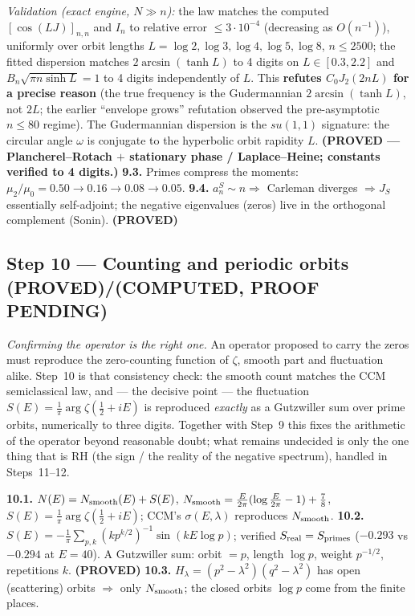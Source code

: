 \documentclass[11pt]{amsart}
\theoremstyle{definition}
\theoremstyle{remark}
\newcommand{\PROVED}{\textbf{(PROVED)}}
\newcommand{\COMP}{\textbf{(COMPUTED, PROOF PENDING)}}
\begin{document}
\noindent\emph{Validation (exact engine, $N\gg n$):} the law matches the computed
$[\cos(LJ)]_{n,n}$ and $I_n$ to relative error $\le3\cdot10^{-4}$ (decreasing as $O(n^{-1})$),
uniformly over orbit lengths $L=\log2,\log3,\log4,\log5,\log8$, $n\le2500$; the fitted dispersion
matches $2\arcsin(\tanh L)$ to 4 digits on $L\in[0.3,2.2]$ and $B_n\sqrt{\pi n\sinh L}=1$ to 4
digits independently of $L$. This \textbf{refutes $C_0J_2(2nL)$ for a precise reason} (the true
frequency is the Gudermannian $2\arcsin(\tanh L)$, not $2L$; the earlier ``envelope grows''
refutation observed the pre-asymptotic $n\le80$ regime). The Gudermannian dispersion is the
$su(1,1)$ signature: the circular angle $\omega$ is conjugate to the hyperbolic orbit rapidity $L$.
\textbf{(PROVED --- Plancherel--Rotach $+$ stationary phase / Laplace--Heine; constants verified
to 4 digits.)}
\textbf{9.3.} Primes compress the moments: $\mu_2/\mu_0=0.50\to0.16\to0.08\to0.05$.
\textbf{9.4.} $a_n^S\sim n\Rightarrow$ Carleman diverges $\Rightarrow J_S$ essentially
self-adjoint; the negative eigenvalues (zeros) live in the orthogonal complement (Sonin).
\PROVED

\subsection{Step 10 --- Counting and periodic orbits \PROVED/\COMP}

\emph{Confirming the operator is the right one.} An operator proposed to carry the zeros must
reproduce the zero-counting function of $\zeta$, smooth part and fluctuation alike. Step~10 is
that consistency check: the smooth count matches the CCM semiclassical law, and --- the decisive
point --- the fluctuation $S(E)=\frac1\pi\arg\zeta(\tfrac12+iE)$ is reproduced \emph{exactly} as
a Gutzwiller sum over prime orbits, numerically to three digits. Together with Step~9 this fixes
the arithmetic of the operator beyond reasonable doubt; what remains undecided is only the one
thing that is RH (the sign / the reality of the negative spectrum), handled in Steps~11--12.

\textbf{10.1.} $N(E)=N_{\rm smooth}(E)+S(E)$,
$N_{\rm smooth}=\tfrac{E}{2\pi}(\log\tfrac{E}{2\pi}-1)+\tfrac78$,
$S(E)=\tfrac1\pi\arg\zeta(\tfrac12+iE)$; CCM's $\sigma(E,\lambda)$ reproduces $N_{\rm smooth}$.
\textbf{10.2.} $S(E)=-\tfrac1\pi\sum_{p,k}(kp^{k/2})^{-1}\sin(kE\log p)$; verified
$S_{\rm real}=S_{\rm primes}$ ($-0.293$ vs $-0.294$ at $E{=}40$). A Gutzwiller sum: orbit $=p$,
length $\log p$, weight $p^{-1/2}$, repetitions $k$. \PROVED
\textbf{10.3.} $H_\lambda=(p^2-\lambda^2)(q^2-\lambda^2)$ has open (scattering) orbits $\Rightarrow$
only $N_{\rm smooth}$; the closed orbits $\log p$ come from the finite places.
\end{document}
